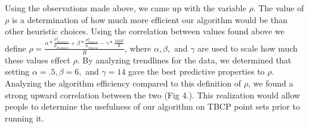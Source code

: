 \documentclass[sigconf, anonymous, pdftex]{acmart}
\begin{document}
Using the observations made above, we came up with the variable $\rho$. The value of $\rho$ is a determination of how much more efficient our algorithm would be than other heuristic choices. Using the correlation between values found above we define $\rho = \frac{\alpha * \frac{\sigma^2_{Distance}}{\mu_{Distance}} + \beta * \frac{\sigma^2_{Closest}}{\mu_{Closest}} - \gamma * \frac{MST}{R}}{R}$, where $\alpha, \beta,$ and $\gamma$ are used to scale how much these values effect $\rho$. By analyzing trendlines for the data, we determined that setting $\alpha = .5, \beta = 6, $ and $\gamma = 14$ gave the best predictive properties to $\rho$. Analyzing the algorithm efficiency compared to this definition of $\rho$, we found a strong upward correlation between the two (Fig 4.). This realization would allow people to determine the usefulness of our algorithm on TBCP point sets prior to running it.\\
\end{document}
